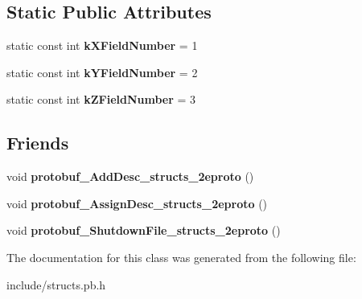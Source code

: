 \subsection*{Static Public Attributes}
\begin{DoxyCompactItemize}
\item 
\hypertarget{classstruct_definitions_1_1_point3_d_a22a3abfea47bd366ae4378a7de0c9925}{}\label{classstruct_definitions_1_1_point3_d_a22a3abfea47bd366ae4378a7de0c9925} 
static const int {\bfseries k\+X\+Field\+Number} = 1
\item 
\hypertarget{classstruct_definitions_1_1_point3_d_a1447a615218726885137a89eb6e55cdd}{}\label{classstruct_definitions_1_1_point3_d_a1447a615218726885137a89eb6e55cdd} 
static const int {\bfseries k\+Y\+Field\+Number} = 2
\item 
\hypertarget{classstruct_definitions_1_1_point3_d_a13e132437de79782a12c7ba5e9746a14}{}\label{classstruct_definitions_1_1_point3_d_a13e132437de79782a12c7ba5e9746a14} 
static const int {\bfseries k\+Z\+Field\+Number} = 3
\end{DoxyCompactItemize}
\subsection*{Friends}
\begin{DoxyCompactItemize}
\item 
\hypertarget{classstruct_definitions_1_1_point3_d_abcf9b7cc173b6d79696d01156751b8ce}{}\label{classstruct_definitions_1_1_point3_d_abcf9b7cc173b6d79696d01156751b8ce} 
void {\bfseries protobuf\+\_\+\+Add\+Desc\+\_\+structs\+\_\+2eproto} ()
\item 
\hypertarget{classstruct_definitions_1_1_point3_d_adb32752ff5178cb902966da6e3cb3bc6}{}\label{classstruct_definitions_1_1_point3_d_adb32752ff5178cb902966da6e3cb3bc6} 
void {\bfseries protobuf\+\_\+\+Assign\+Desc\+\_\+structs\+\_\+2eproto} ()
\item 
\hypertarget{classstruct_definitions_1_1_point3_d_ac2e4278d7604361fa6502b1cfbf9d980}{}\label{classstruct_definitions_1_1_point3_d_ac2e4278d7604361fa6502b1cfbf9d980} 
void {\bfseries protobuf\+\_\+\+Shutdown\+File\+\_\+structs\+\_\+2eproto} ()
\end{DoxyCompactItemize}


The documentation for this class was generated from the following file\+:\begin{DoxyCompactItemize}
\item 
include/structs.\+pb.\+h\end{DoxyCompactItemize}
